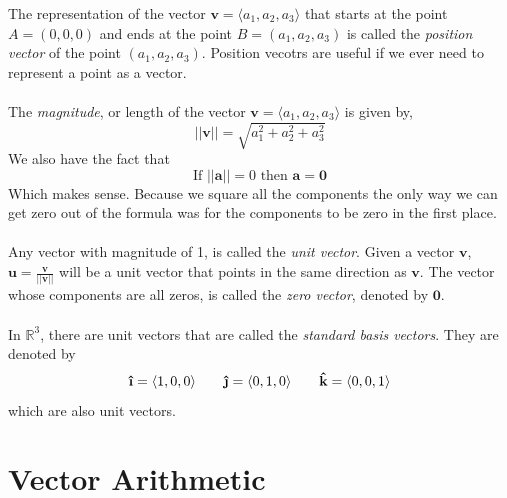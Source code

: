 \documentclass[10pt,reqno]{book}
\theoremstyle{definition}
\renewcommand{\vec}[1]{\mathbf{#1}}
\newcommand{\uvec}[1]{\boldsymbol{\hat{\textbf{#1}}}}
\def\R{\mathbb{R}}
\begin{document}
	The representation of the vector $\vec{v} = \langle a_1,a_2,a_3 \rangle$ that starts at the point $A=(0,0,0)$ and ends at the point $B=(a_1,a_2,a_3)$ is called the \textit{position vector} of the point $(a_1,a_2,a_3)$. Position vecotrs are useful if we ever need to represent a point as a vector.\\ \\
	The \textit{magnitude}, or length of the vector $\vec{v} = \langle a_1,a_2,a_3 \rangle$ is given by,
	\[ || \vec{v} || = \sqrt{a_1^2 + a_2^2 + a_3^2} \]
	We also have the fact that
	\[ \text{If } ||\vec{a}|| = 0 \text{ then } \vec{a} = \vec{0} \]
	Which makes sense. Because we square all the components the only way we can get zero out of the formula was for the components to be zero in the first place.\\ \\
	Any vector with magnitude of 1, is called the \textit{unit vector}. Given a vector $\vec{v}$, $\vec{u} = \displaystyle{\frac{\vec{v}}{||\vec{v}||}}$ will be a unit vector that points in the same direction as $\vec{v}$. The vector whose components are all zeros, is called the \textit{zero vector}, denoted by $\vec{0}$.\\ \\
	In $\R^3$, there are unit vectors that are called the \textit{standard basis vectors}. They are denoted by 
	\[ \uvec{\i} = \langle 1,0,0 \rangle \qquad \uvec{\j} = \langle 0,1,0 \rangle \qquad \uvec{k} = \langle 0,0,1 \rangle \]
	which are also unit vectors.

	\section{Vector Arithmetic}
\end{document}
